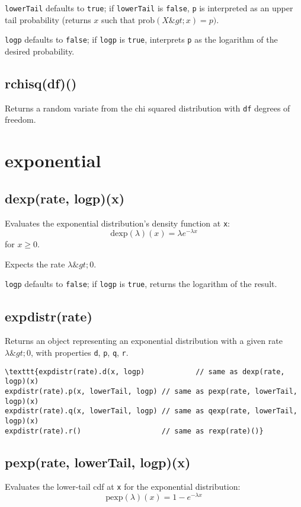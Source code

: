 \documentclass{article}
\begin{document}
\texttt{lowerTail} defaults to \texttt{true}; if \texttt{lowerTail} is \texttt{false}, \texttt{p} is
interpreted as an upper tail probability (returns
$x$ such that $\textrm{prob}(X \&gt; x) = p)$.


\texttt{logp} defaults to \texttt{false}; if \texttt{logp} is \texttt{true}, interprets \texttt{p} as
the logarithm of the desired probability.


    \subsection*{rchisq(df)()}
    Returns a random variate from the chi squared distribution with \texttt{df} degrees
of freedom.


  \section{exponential}
    \subsection*{dexp(rate, logp)(x)}
    Evaluates the exponential distribution's density function at \texttt{x}:
$$\textrm{dexp}(\lambda)(x) = \lambda e^{-\lambda x}$$
for $x \geq 0$.


Expects the rate $\lambda \&gt; 0$.


\texttt{logp} defaults to \texttt{false}; if \texttt{logp} is \texttt{true}, returns the
logarithm of the result.


    \subsection*{expdistr(rate)}
    Returns an object representing an exponential distribution with a
given rate $\lambda \&gt; 0$,
with properties \texttt{d}, \texttt{p}, \texttt{q}, \texttt{r}.


\begin{lstlisting}
\texttt{expdistr(rate).d(x, logp)            // same as dexp(rate, logp)(x)
expdistr(rate).p(x, lowerTail, logp) // same as pexp(rate, lowerTail, logp)(x)
expdistr(rate).q(x, lowerTail, logp) // same as qexp(rate, lowerTail, logp)(x)
expdistr(rate).r()                   // same as rexp(rate)()}\end{lstlisting}

    \subsection*{pexp(rate, lowerTail, logp)(x)}
    Evaluates the lower-tail cdf at \texttt{x} for the exponential distribution:
$$\textrm{pexp}(\lambda)(x) = 1 - e^{-\lambda x}$$
\end{document}
